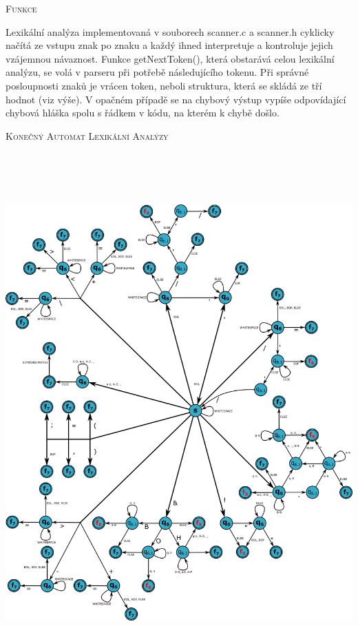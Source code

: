 \documentclass[12pt,a4paper]{report}
\begin{document}
    {\scshape\Large Funkce\par}
    \vspace{0.3cm}
    Lexikální analýza implementovaná v souborech scanner.c a scanner.h cyklicky načítá ze vstupu znak po znaku a každý ihned interpretuje a kontroluje jejich vzájemnou návaznost. Funkce getNextToken(), která obstarává celou lexikální analýzu, se volá v parseru při potřebě následujícího tokenu. Při správné posloupnosti znaků je vrácen token, neboli struktura, která se skládá ze tří hodnot (viz výše). V opačném případě se na chybový výstup vypíše odpovídající chybová hláška spolu s řádkem v kódu, na kterém k chybě došlo.
    \newpage

    {\scshape\Large Konečný Automat Lexikální Analýzy\par}
    \vspace{0.2cm}
    \centerline{\includegraphics[height=20cm]{KA}}
    {\newpage}
\end{document}
